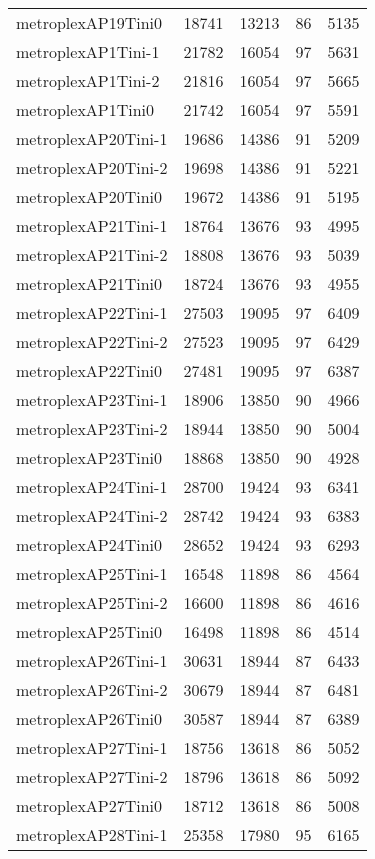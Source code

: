 \begin{longtable}{lrrrr}
metroplexAP19Tini0 & 18741 & 13213 & 86 & 5135 \\
metroplexAP1Tini-1 & 21782 & 16054 & 97 & 5631 \\
metroplexAP1Tini-2 & 21816 & 16054 & 97 & 5665 \\
metroplexAP1Tini0 & 21742 & 16054 & 97 & 5591 \\
metroplexAP20Tini-1 & 19686 & 14386 & 91 & 5209 \\
metroplexAP20Tini-2 & 19698 & 14386 & 91 & 5221 \\
metroplexAP20Tini0 & 19672 & 14386 & 91 & 5195 \\
metroplexAP21Tini-1 & 18764 & 13676 & 93 & 4995 \\
metroplexAP21Tini-2 & 18808 & 13676 & 93 & 5039 \\
metroplexAP21Tini0 & 18724 & 13676 & 93 & 4955 \\
metroplexAP22Tini-1 & 27503 & 19095 & 97 & 6409 \\
metroplexAP22Tini-2 & 27523 & 19095 & 97 & 6429 \\
metroplexAP22Tini0 & 27481 & 19095 & 97 & 6387 \\
metroplexAP23Tini-1 & 18906 & 13850 & 90 & 4966 \\
metroplexAP23Tini-2 & 18944 & 13850 & 90 & 5004 \\
metroplexAP23Tini0 & 18868 & 13850 & 90 & 4928 \\
metroplexAP24Tini-1 & 28700 & 19424 & 93 & 6341 \\
metroplexAP24Tini-2 & 28742 & 19424 & 93 & 6383 \\
metroplexAP24Tini0 & 28652 & 19424 & 93 & 6293 \\
metroplexAP25Tini-1 & 16548 & 11898 & 86 & 4564 \\
metroplexAP25Tini-2 & 16600 & 11898 & 86 & 4616 \\
metroplexAP25Tini0 & 16498 & 11898 & 86 & 4514 \\
metroplexAP26Tini-1 & 30631 & 18944 & 87 & 6433 \\
metroplexAP26Tini-2 & 30679 & 18944 & 87 & 6481 \\
metroplexAP26Tini0 & 30587 & 18944 & 87 & 6389 \\
metroplexAP27Tini-1 & 18756 & 13618 & 86 & 5052 \\
metroplexAP27Tini-2 & 18796 & 13618 & 86 & 5092 \\
metroplexAP27Tini0 & 18712 & 13618 & 86 & 5008 \\
metroplexAP28Tini-1 & 25358 & 17980 & 95 & 6165 \\

\end{longtable}
